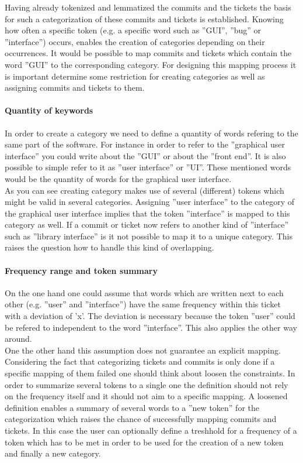 Having already tokenized and lemmatized the commits and the tickets the basis for such a categorization of these commits and tickets is established.
Knowing how often a specific token (e.g. a specific word such as ''GUI'', ''bug'' or ''interface'') occurs, enables the creation of categories  depending on their occurrences.
It would be possible to map commits and tickets which contain the word ''GUI'' to the corresponding category.
For designing this mapping process it is important determine some restriction for creating categories as well as assigning commits and tickets to them. 

\paragraph{Quantity of keywords}

In order to create a category we need to define a quantity of words refering to the same part of the software.
For instance in order to refer to the ''graphical user interface'' you could write about the ''GUI'' or about the ''front end''.
It is also possible to simple refer to it as ''user interface'' or ''UI''.
These mentioned words would be the quantity of words for the graphical user interface. \\
As you can see creating category makes use of several (different) tokens which might be valid in several categories.
Assigning ''user interface'' to the category of the graphical user interface implies that the token ''interface'' is mapped to this category as well.
If a commit or ticket now refers to another kind of ''interface'' such as ''library interface'' is it not possible to map it to a unique category.
This raises the question how to handle this kind of overlapping. 

\paragraph{Frequency range and token summary}

On the one hand one could assume that words which are written next to each other (e.g. ''user'' and  ''interface'') have the same frequency within this ticket with a deviation of 'x'.
The deviation is necessary because the token ''user'' could be refered to independent to the word ''interface''.
This also applies the other way around. \\
One the other hand this assumption does not guarantee an explicit mapping.
Considering the fact that categorizing tickets and commits is only done if a specific mapping of them failed one should think about loosen the constraints.
In order to summarize several tokens to a single one the definition should not rely on the frequency itself and it should not aim to a specific mapping.
A loosened definition enables a summary of several words to a ''new token'' for the categorization which raises the chance of successfully mapping commits and tickets.
In this case the user can optionally define a treshhold for a frequency of a token which has to be met in order to be used for the creation of a new token and finally a new category.


